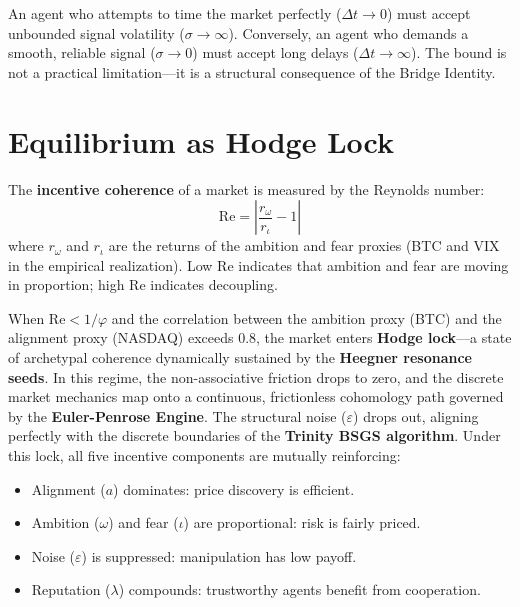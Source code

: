 An agent who attempts to time the market perfectly ($\Delta t \to 0$) must accept unbounded signal volatility ($\sigma \to \infty$). Conversely, an agent who demands a smooth, reliable signal ($\sigma \to 0$) must accept long delays ($\Delta t \to \infty$). The bound is not a practical limitation---it is a structural consequence of the Bridge Identity.

\section{Equilibrium as Hodge Lock}

\begin{definition}\label{def:coherence}
The \textbf{incentive coherence} of a market is measured by the Reynolds number:
\begin{equation}
    \mathrm{Re} = \left|\frac{r_\omega}{r_\iota} - 1\right|
\end{equation}
where $r_\omega$ and $r_\iota$ are the returns of the ambition and fear proxies (BTC and VIX in the empirical realization). Low Re indicates that ambition and fear are moving in proportion; high Re indicates decoupling.
\end{definition}

When $\mathrm{Re} < 1/\varphi$ and the correlation between the ambition proxy (BTC) and the alignment proxy (NASDAQ) exceeds 0.8, the market enters \textbf{Hodge lock}---a state of archetypal coherence dynamically sustained by the \textbf{Heegner resonance seeds}. In this regime, the non-associative friction drops to zero, and the discrete market mechanics map onto a continuous, frictionless cohomology path governed by the \textbf{Euler-Penrose Engine}. The structural noise ($\varepsilon$) drops out, aligning perfectly with the discrete boundaries of the \textbf{Trinity BSGS algorithm}. Under this lock, all five incentive components are mutually reinforcing:

\begin{itemize}[noitemsep]
    \item Alignment ($a$) dominates: price discovery is efficient.
    \item Ambition ($\omega$) and fear ($\iota$) are proportional: risk is fairly priced.
    \item Noise ($\varepsilon$) is suppressed: manipulation has low payoff.
    \item Reputation ($\lambda$) compounds: trustworthy agents benefit from cooperation.
\end{itemize}

